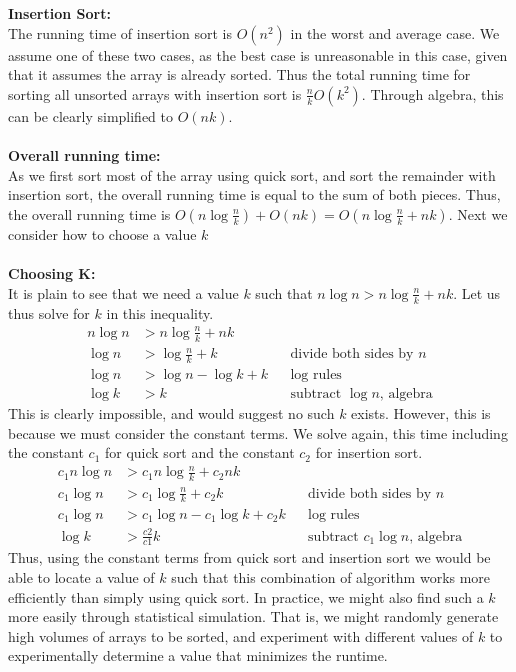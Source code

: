 \documentclass{article}
\begin{document}
\begin{enumerate}
	\\ \\ \textbf{Insertion Sort:}
	\\ The running time of insertion sort is $O(n^2)$ in the worst and average case. We assume one of these two cases, as the best case is unreasonable in this case, given that it assumes the array is already sorted. Thus the total running time for sorting all unsorted arrays with insertion sort is $\frac{n}{k}O(k^2)$. Through algebra, this can be clearly simplified to $O(nk)$.
	\\ \\ \textbf{Overall running time:}
	\\ As we first sort most of the array using quick sort, and sort the remainder with insertion sort, the overall running time is equal to the sum of both pieces. Thus, the overall running time is $O(n\log \frac{n}{k}) + O(nk)= O(n\log \frac{n}{k} + nk)$. Next we consider how to choose a value $k$
	\\ \\ \textbf{Choosing K:}
	\\ It is plain to see that we need a value $k$ such that $ n\log n > n\log \frac{n}{k} + nk$. Let us thus solve for $k$ in this inequality.
	\begin{align}
	n \log n &> n \log \frac{n}{k} + nk  && \text{} \\
	\log n &> \log \frac{n}{k} + k && \text{divide both sides by $n$} \\
	\log n &> \log n - \log k + k && \text{log rules} \\
	\log k &> k && \text{subtract $\log n$, algebra}
	\end{align}
	This is clearly impossible, and would suggest no such $k$ exists. However, this is because we must consider the constant terms. We solve again, this time including the constant $c_1$ for quick sort and the constant $c_2$ for insertion sort.
		\begin{align}
	c_1 n \log n &>c_1 n \log \frac{n}{k} + c_2 nk  && \text{} \\
	c_1 \log n &> c_1 \log \frac{n}{k} + c_2 k && \text{divide both sides by $n$} \\
	c_1 \log n &> c_1 \log n - c_1\log k + c_2 k && \text{log rules} \\
	\log k &> \frac{c2}{c1} k && \text{subtract $c_1 \log n$, algebra}
	\end{align}
	Thus, using the constant terms from quick sort and insertion sort we would be able to locate a value of $k$ such that this combination of algorithm works more efficiently than simply using quick sort. In practice, we might also find such a $k$ more easily through statistical simulation. That is, we might randomly generate high volumes of arrays to be sorted, and experiment with different values of $k$ to experimentally determine a value that minimizes the runtime.

\end{enumerate}
\end{document}
